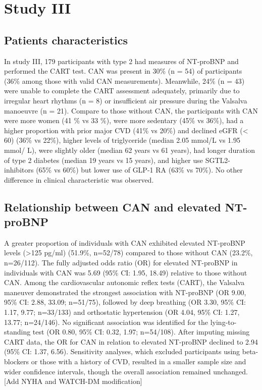 \documentclass[
  a4paper,
  headsepline=true,
  open=any]{scrbook}
\begin{document}
\hypertarget{study-iii-1}{%
\section{Study III}\label{study-iii-1}}

\hypertarget{patients-characteristics}{%
\subsection{Patients characteristics}\label{patients-characteristics}}

In study III, 179 participants with type 2 had measures of NT-proBNP and
performed the CART test. CAN was present in 30\% (n = 54) of
participants (36\% among those with valid CAN measurements). Meanwhile,
24\% (n = 43) were unable to complete the CART assessment adequately,
primarily due to irregular heart rhythms (n = 8) or insufficient air
pressure during the Valsalva manoeuvre (n = 21). Compare to those
without CAN, the participants with CAN were more women (41 \% vs 33 \%),
were more sedentary (45\% vs 36\%), had a higher proportion with prior
major CVD (41\% vs 20\%) and declined eGFR (\textless{} 60) (36\% vs
22\%), higher levels of triglyceride (median 2.05 mmol/L vs 1.95 mmol/
L), were slightly older (median 62 years vs 61 years), had longer
duration of type 2 diabetes (median 19 years vs 15 years), and higher
use SGTL2-inhibitors (65\% vs 60\%) but lower use of GLP-1 RA (63\% vs
70\%). No other difference in clinical characteristic was observed.

\hypertarget{relationship-between-can-and-elevated-nt-probnp}{%
\subsection{Relationship between CAN and elevated
NT-proBNP}\label{relationship-between-can-and-elevated-nt-probnp}}

A greater proportion of individuals with CAN exhibited elevated
NT-proBNP levels (\textgreater125 pg/ml) (51.9\%, n=52/78) compared to
those without CAN (23.2\%, n=26/112). The fully adjusted odds ratio (OR)
for elevated NT-proBNP in individuals with CAN was 5.69 (95\% CI: 1.95,
18.49) relative to those without CAN. Among the cardiovascular autonomic
reflex tests (CART), the Valsalva maneuver demonstrated the strongest
association with NT-proBNP (OR 9.00, 95\% CI: 2.88, 33.09; n=51/75),
followed by deep breathing (OR 3.30, 95\% CI: 1.17, 9.77; n=33/133) and
orthostatic hypertension (OR 4.04, 95\% CI: 1.27, 13.77; n=24/146). No
significant association was identified for the lying-to-standing test
(OR 0.80, 95\% CI: 0.32, 1.97; n=54/108). After imputing missing CART
data, the OR for CAN in relation to elevated NT-proBNP declined to 2.94
(95\% CI: 1.37, 6.56). Sensitivity analyses, which excluded participants
using beta-blockers or those with a history of CVD, resulted in a
smaller sample size and wider confidence intervals, though the overall
association remained unchanged. {[}Add NYHA and WATCH-DM modification{]}
\end{document}
